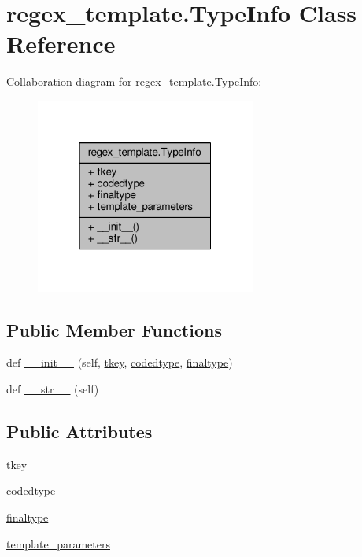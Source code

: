 \hypertarget{classregex__template_1_1TypeInfo}{}\section{regex\+\_\+template.\+Type\+Info Class Reference}
\label{classregex__template_1_1TypeInfo}


Collaboration diagram for regex\+\_\+template.\+Type\+Info\+:
\nopagebreak
\begin{figure}[H]
\begin{center}
\leavevmode
\includegraphics[width=205pt]{classregex__template_1_1TypeInfo__coll__graph}
\end{center}
\end{figure}
\subsection*{Public Member Functions}
\begin{DoxyCompactItemize}
\item 
def \hyperlink{classregex__template_1_1TypeInfo_a1dfd13e416dedc262934b318aac178cf}{\+\_\+\+\_\+init\+\_\+\+\_\+} (self, \hyperlink{classregex__template_1_1TypeInfo_a28a57ea9411ccf02c14c3936403e76c6}{tkey}, \hyperlink{classregex__template_1_1TypeInfo_a40ab22efd190d9583e0d57d6c6bb3112}{codedtype}, \hyperlink{classregex__template_1_1TypeInfo_a7a95ce84d210a4c19a6b6b025fded915}{finaltype})
\item 
def \hyperlink{classregex__template_1_1TypeInfo_a6cd8f468425b67238a7604bafbe4b05a}{\+\_\+\+\_\+str\+\_\+\+\_\+} (self)
\end{DoxyCompactItemize}
\subsection*{Public Attributes}
\begin{DoxyCompactItemize}
\item 
\hyperlink{classregex__template_1_1TypeInfo_a28a57ea9411ccf02c14c3936403e76c6}{tkey}
\item 
\hyperlink{classregex__template_1_1TypeInfo_a40ab22efd190d9583e0d57d6c6bb3112}{codedtype}
\item 
\hyperlink{classregex__template_1_1TypeInfo_a7a95ce84d210a4c19a6b6b025fded915}{finaltype}
\item 
\hyperlink{classregex__template_1_1TypeInfo_a6b61480cfa79fe1e43df6e0063b3f7de}{template\+\_\+parameters}
\end{DoxyCompactItemize}


